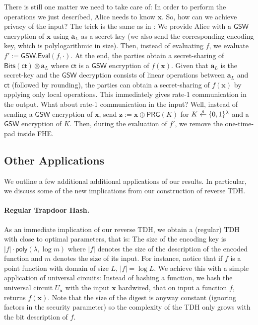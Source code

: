 \documentclass{theoretics}
\newcommand{\getsr}{\overset{\raisebox{-1pt}{$\scriptscriptstyle \$$}}{\gets}}
\newcommand{\sample}{\getsr}
\newcommand{\GSW}{\mathsf{GSW}}
\newcommand{\poly}{\mathsf{poly}}
\renewcommand{\sec}{\ensuremath{\lambda}}
\newcommand{\ct}{\mathsf{ct}}
\newcommand{\algofont}[1]{\ensuremath{\mathsf{#1}}}
\newcommand{\Eval}{\algofont{Eval}\xspace}
\begin{document}
There is still one matter we need to take care of: In order to perform the operations we just described, Alice needs to know $\mathbf{x}$. So, how can we achieve privacy of the input? The trick is the same as in \cite{TCC:BTVW17}: We provide Alice with a $\mathsf{GSW}$ \cite{C:GenSahWat13} encryption of $\mathbf{x}$ using $\mathbf{a}_L$ as a secret key (we also send the corresponding encoding key, which is polylogarithmic in size). Then, instead of evaluating $f$, we evaluate $f':=\GSW.\Eval(f, \cdot)$. At the end, the parties obtain a secret-sharing of $\mathsf{Bits}(\ct)\otimes \mathbf{a}_L$ where $\ct$ is a $\GSW$ encryption of $f(\mathbf{x})$. Given that $\mathbf{a}_L$ is the secret-key and the $\GSW$ decryption consists of linear operations  between $\mathbf{a}_L$ and $\ct$ (followed by rounding), the parties can obtain a secret-sharing of $f(\mathbf{x})$ by applying only local operations. This immediately gives rate-1 communication in the output. What about rate-1 communication in the input? Well, instead of sending a $\GSW$ encryption of $\mathbf{x}$, send $\mathbf{z}:=\mathbf{x}\oplus \mathsf{PRG}(K)$ for $K\sample\{0, 1\}^\sec$ and a $\GSW$ encryption of $K$. Then, during the evaluation of $f'$, we remove the one-time-pad inside FHE.





\subsection{Other Applications}\label{sec:apps}

We outline a few additional additional applications of our results. In particular, we discuss some of the new implications from our construction of reverse TDH.

\paragraph{Regular Trapdoor Hash.}
As an immediate implication of our reverse TDH, we obtain a (regular) TDH \cite{C:DGIMMO19} with close to optimal parameters, that is: The size of the encoding key is $\lvert f\rvert \cdot \poly(\sec, \log m)$ where $\lvert f\rvert$ denotes the size of the description of the encoded function and $m$ denotes the size of its input. For instance, notice that if $f$ is a point function with domain of size $L$, $\lvert f\rvert=\log L$. 
We achieve this with a simple application of universal circuits: Instead of hashing a function, we hash the universal circuit $U_\mathbf{x}$ with the input $\mathbf{x}$ hardwired, that on input a function $f$, returns $f(\mathbf{x})$. Note that the size of the digest is anyway constant (ignoring factors in the security parameter) so the complexity of the TDH only grows with the bit description of $f$.
\end{document}
